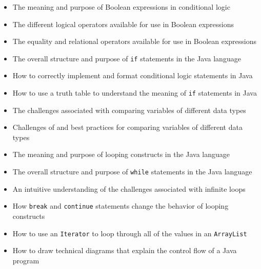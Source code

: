 \documentclass[11pt]{article}
\begin{document}
\begin{itemize}

  \itemsep 0in

  \item The meaning and purpose of Boolean expressions in conditional logic

  \item The different logical operators available for use in Boolean expressions

  \item The equality and relational operators available for use in Boolean expressions

  \item The overall structure and purpose of {\tt if} statements in the Java
    language

  \item How to correctly implement and format conditional logic statements in
    Java

  \item How to use a truth table to understand the meaning of {\tt if}
    statements in Java

  \item The challenges associated with comparing variables of different data
    types

  \item Challenges of and best practices for comparing variables of different
    data types

  \item The meaning and purpose of looping constructs in the Java language

  \item The overall structure and purpose of {\tt while} statements in the Java
    language

  \item An intuitive understanding of the challenges associated with infinite
    loops

  \item How {\tt break} and {\tt continue} statements change the behavior of looping constructs

  \item How to use an {\tt Iterator} to loop through all of the values in an
    {\tt ArrayList}

  \item How to draw technical diagrams that explain the control flow of a Java
    program

\end{itemize}
\end{document}
